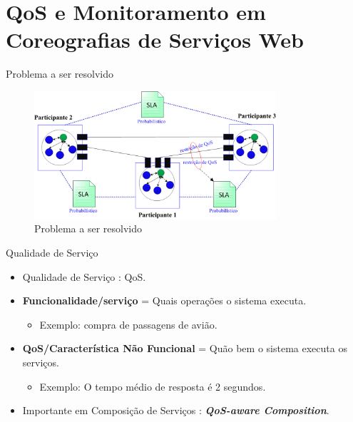 \documentclass[xcolor=svgnames]{beamer}
\begin{document}
\section{QoS e Monitoramento em Coreografias de Serviços Web }

    \begin{frame}{Problema a ser resolvido}
      \begin{figure}[!h]
	  \centering
	  \includegraphics[width=0.8\textwidth]{ChoreographySLAs.png}
	  \caption{Problema a ser resolvido}
      \end{figure}	
    \end{frame}

    \begin{frame}{Qualidade de Serviço}
        \begin{itemize}
          \item Qualidade de Serviço : QoS.
          \item \textbf{Funcionalidade/serviço} = Quais operações o sistema executa.
                \begin{itemize}
                    \item Exemplo: compra de passagens de avião.
                \end{itemize}

          \item \textbf{QoS/Característica Não Funcional} = Quão bem o sistema executa os serviços.
                \begin{itemize}
                    \item Exemplo: O tempo médio de resposta é 2 segundos.
                \end{itemize}
          \item Importante em Composição de Serviços : \textbf{\emph{QoS-aware Composition}}.
        \end{itemize}
  \end{frame}
\end{document}
